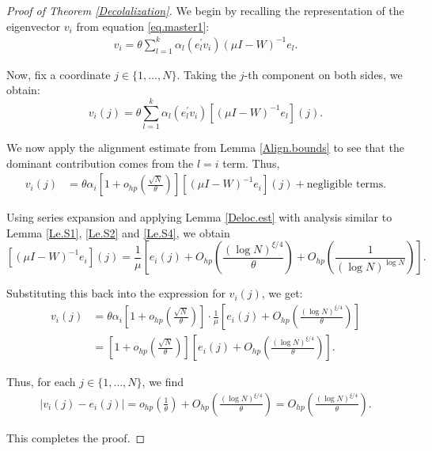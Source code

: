 \documentclass[11pt, reqno]{amsart}
\numberwithin{equation}{section}
\begin{document}
\begin{proof}[Proof of Theorem \ref{Decolalization}]
We begin by recalling the representation of the eigenvector \( v_i \) from equation \eqref{eq.master1}:
\begin{align*}
v_i = \theta \sum_{l=1}^k \alpha_l (e_l^\prime v_i) (\mu I - W)^{-1} e_l.
\end{align*}


Now, fix a coordinate \( j \in \{1, \dots, N\} \). Taking the \( j \)-th component on both sides, we obtain:
\[
v_i(j) = \theta \sum_{l=1}^k \alpha_l (e_l^\prime v_i) \left[ (\mu I - W)^{-1} e_l \right](j).
\]

We now apply the alignment estimate from Lemma \ref{Align.bounds} to see that the dominant contribution comes from the \( l = i \) term. Thus,
\begin{align*}
v_i(j) 
&= \theta \alpha_i \left[1 + o_{hp}\left( \frac{\sqrt{N}}{\theta} \right)\right] \left[ (\mu I - W)^{-1} e_i \right](j) + \text{negligible terms}.
\end{align*}

Using series expansion and applying Lemma \ref{Deloc.est} with analysis similar to Lemma \ref{Le.S1}, \ref{Le.S2} and \ref{Le.S4}, we obtain
\[
\left[ (\mu I - W)^{-1} e_i \right](j) 
= \frac{1}{\mu} \left[ e_i(j) + O_{hp}\left( \frac{(\log N)^{\xi/4}}{\theta} \right) + O_{hp}\left( \frac{1}{(\log N)^{\log N}} \right) \right].
\]

Substituting this back into the expression for \( v_i(j) \), we get:
\begin{align*}
v_i(j) 
&= \theta \alpha_i \left[1 + o_{hp}\left( \frac{\sqrt{N}}{\theta} \right) \right]
\cdot \frac{1}{\mu} \left[ e_i(j) + O_{hp}\left( \frac{(\log N)^{\xi/4}}{\theta} \right) \right] \\
&= \left[1 + o_{hp}\left( \frac{\sqrt{N}}{\theta} \right)\right] \left[ e_i(j) + O_{hp}\left( \frac{(\log N)^{\xi/4}}{\theta} \right) \right].
\end{align*}

Thus, for each \( j \in \{1, \dots, N\} \), we find
\begin{align}
\label{conclusion}
|v_i(j) - e_i(j)| 
= o_{hp}\left( \frac{1}{\theta} \right) + O_{hp}\left( \frac{(\log N)^{\xi/4}}{\theta} \right)
= O_{hp}\left( \frac{(\log N)^{\xi/4}}{\theta} \right).
\end{align}

This completes the proof.
\end{proof}
\end{document}

